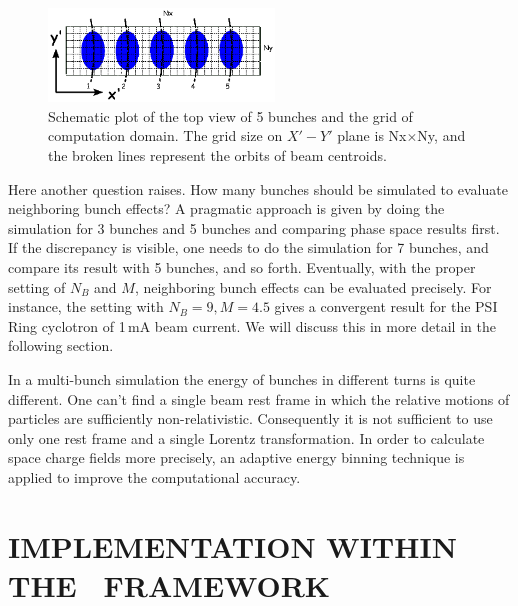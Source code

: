 \documentclass{JAC2003}
\begin{document}
\begin{figure}

  \centering
  \includegraphics[width=60mm]{figures/SM-MultiBunch.ps}
  \caption{Schematic plot of the top view of 5 bunches and the grid of computation domain. The grid size on $X'-Y'$ plane is Nx$\times$Ny, and the broken lines represent the orbits of beam centroids. }
  \label{fig:MultiBunch}
\end{figure}

Here another question raises. How many bunches should be simulated to evaluate neighboring bunch effects?  
A pragmatic approach is given by doing the simulation for 3 bunches and 5 bunches and comparing phase space results first. If the discrepancy is visible, one needs to do 
the simulation for 7 bunches, and compare its result with 5 bunches, and so forth. 
Eventually, with the proper setting of $N_B$ and $M$, neighboring bunch effects can be evaluated precisely.
For instance, the setting with $N_B=9, M=4.5$ gives a convergent result for the PSI Ring cyclotron of 1\,mA beam current.
We will discuss this in more detail in the following section. 

In a multi-bunch simulation the energy of bunches in different turns is quite different. One can't find a single beam rest frame in which the relative motions of 
particles are sufficiently non-relativistic. Consequently it is not sufficient to use only one rest frame 
and a single Lorentz transformation. In order to calculate space charge fields more precisely, an adaptive energy binning technique is applied to improve 
the computational accuracy. 

\section{IMPLEMENTATION WITHIN THE \opal \  FRAMEWORK}
\end{document}
